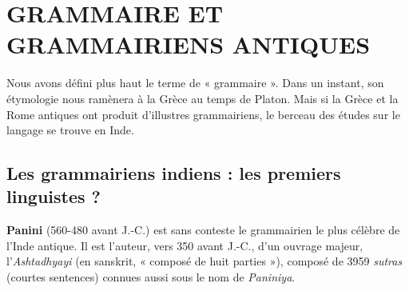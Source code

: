 \section{GRAMMAIRE ET GRAMMAIRIENS ANTIQUES}
Nous avons défini plus haut le terme de « grammaire ». Dans un instant, son étymologie nous ramènera à la Grèce au temps de Platon. Mais si la Grèce et la Rome antiques ont produit d’illustres grammairiens, le berceau des études sur le langage se trouve en Inde.
\subsection{Les grammairiens indiens : les premiers linguistes ?}
\textbf{Panini} (560-480 avant J.-C.) est sans conteste le grammairien le plus célèbre de l’Inde antique. Il est l’auteur, vers 350 avant J.-C., d’un ouvrage majeur, l’\textit{Ashtadhyayi} (en sanskrit, « composé de huit parties »), composé de 3959 \textit{sutras} (courtes sentences) connues aussi sous le nom de \textit{Paniniya}.
